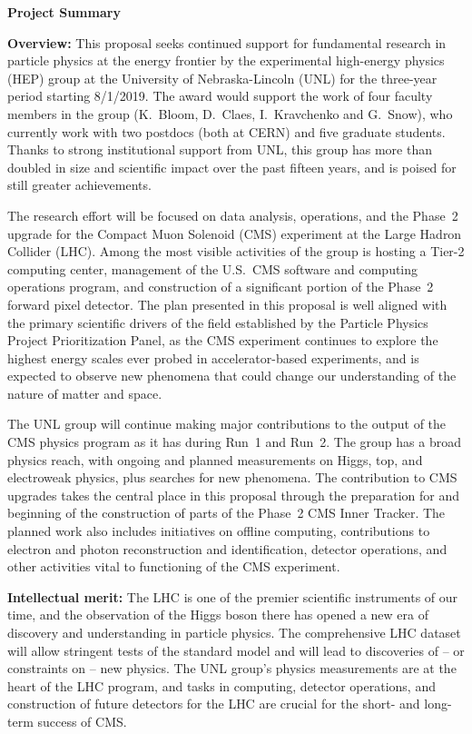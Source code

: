 \documentclass[11pt]{article}
\begin{document}
\begin{center}
{\large \bf Project Summary}\\
\end{center}

{\bf Overview:} This proposal seeks continued support for fundamental research in particle physics at the energy
frontier by the experimental high-energy physics (HEP) group at the University of Nebraska-Lincoln (UNL) for the
three-year period starting 8/1/2019.  The award would support the work of four faculty members in the group (K.~Bloom, D.~Claes, I.~Kravchenko and G.~Snow), who currently work with two postdocs (both at CERN) and five graduate students.  Thanks to strong institutional support from UNL, 
this group has more than doubled in size and scientific impact over the 
past fifteen years, and is poised for still greater achievements.

The research effort will be focused on data analysis, operations, and the Phase~2 upgrade for the Compact Muon Solenoid (CMS) experiment at the Large Hadron Collider (LHC).  Among the most visible activities of the group is hosting a Tier-2 computing center, management of the U.S.~CMS software and computing operations program, and construction of a significant portion of the Phase~2 forward pixel detector. The plan presented in this proposal is well aligned with the primary scientific drivers of the field established by the Particle Physics Project Prioritization Panel, as the CMS experiment continues to explore the highest energy scales ever probed in accelerator-based experiments, and is expected to observe new phenomena that could change our understanding of the nature of matter and space. 

The UNL group will continue making major contributions to the output of the CMS physics program as it has during Run~1 and Run~2. The group has a broad physics reach, with ongoing and planned measurements on Higgs, top, and electroweak physics, plus searches for new phenomena. The contribution to CMS upgrades takes the central place in this proposal through the preparation for and beginning of the construction of parts of the Phase~2 CMS Inner Tracker. The planned work also includes initiatives on offline computing, contributions to electron and photon reconstruction and identification, detector operations, and other activities vital to functioning of the CMS experiment.

{\bf Intellectual merit:} The LHC is one of the premier scientific
instruments of our time, and the observation of the Higgs boson
there has opened a new era of discovery and understanding in
particle physics. The comprehensive LHC dataset 
will allow stringent tests of the standard model and will
lead to discoveries of -- or constraints on -- new physics.
The UNL group's physics measurements are at the heart of the LHC
program, and tasks in computing, detector operations, and
construction of future detectors for the LHC are crucial for the
short- and long-term success of CMS.
\end{document}
